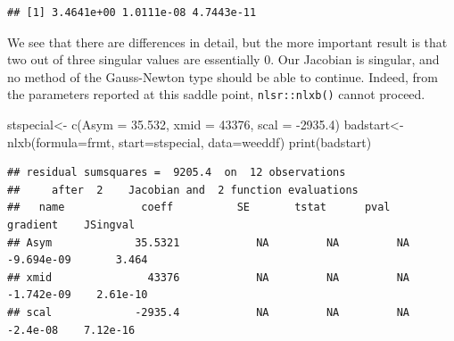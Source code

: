 \documentclass[
]{article}
\newenvironment{Shaded}{\begin{snugshade}}{\end{snugshade}}
\newcommand{\AttributeTok}[1]{\textcolor[rgb]{0.77,0.63,0.00}{#1}}
\newcommand{\CommentTok}[1]{\textcolor[rgb]{0.56,0.35,0.01}{\textit{#1}}}
\newcommand{\ControlFlowTok}[1]{\textcolor[rgb]{0.13,0.29,0.53}{\textbf{#1}}}
\newcommand{\DecValTok}[1]{\textcolor[rgb]{0.00,0.00,0.81}{#1}}
\newcommand{\FloatTok}[1]{\textcolor[rgb]{0.00,0.00,0.81}{#1}}
\newcommand{\FunctionTok}[1]{\textcolor[rgb]{0.00,0.00,0.00}{#1}}
\newcommand{\NormalTok}[1]{#1}
\newcommand{\OtherTok}[1]{\textcolor[rgb]{0.56,0.35,0.01}{#1}}
\newcommand{\SpecialCharTok}[1]{\textcolor[rgb]{0.00,0.00,0.00}{#1}}
\newcommand{\StringTok}[1]{\textcolor[rgb]{0.31,0.60,0.02}{#1}}
\begin{document}
\begin{Shaded}
\end{Shaded}

\begin{verbatim}
## [1] 3.4641e+00 1.0111e-08 4.7443e-11
\end{verbatim}

We see that there are differences in detail, but the more important
result is that two out of three singular values are essentially 0. Our
Jacobian is singular, and no method of the Gauss-Newton type should be
able to continue. Indeed, from the parameters reported at this saddle
point, \texttt{nlsr::nlxb()} cannot proceed.

\begin{Shaded}
\begin{Highlighting}[]
\NormalTok{stspecial}\OtherTok{\textless{}{-}} \FunctionTok{c}\NormalTok{(}\AttributeTok{Asym =} \FloatTok{35.532}\NormalTok{,  }\AttributeTok{xmid =} \DecValTok{43376}\NormalTok{,  }\AttributeTok{scal =} \SpecialCharTok{{-}}\FloatTok{2935.4}\NormalTok{)}
\NormalTok{badstart}\OtherTok{\textless{}{-}}\FunctionTok{nlxb}\NormalTok{(}\AttributeTok{formula=}\NormalTok{frmt, }\AttributeTok{start=}\NormalTok{stspecial, }\AttributeTok{data=}\NormalTok{weeddf)}
\FunctionTok{print}\NormalTok{(badstart)}
\end{Highlighting}
\end{Shaded}

\begin{verbatim}
## residual sumsquares =  9205.4  on  12 observations
##     after  2    Jacobian and  2 function evaluations
##   name            coeff          SE       tstat      pval      gradient    JSingval   
## Asym             35.5321            NA         NA         NA  -9.694e-09       3.464  
## xmid               43376            NA         NA         NA  -1.742e-09    2.61e-10  
## scal             -2935.4            NA         NA         NA    -2.4e-08    7.12e-16
\end{verbatim}
\end{document}
